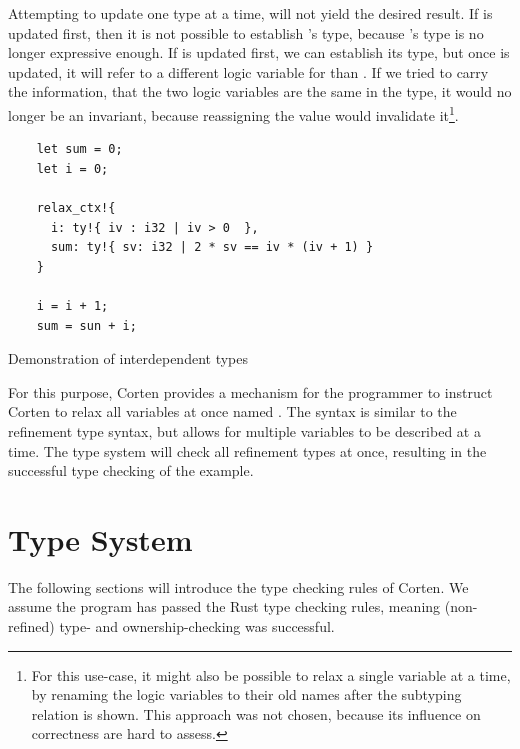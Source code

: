 \documentclass[twoside, english]{sdqthesis}
\theoremstyle{definition}
\begin{document}
Attempting to update one type at a time, will not yield the desired result. If  is updated first, then it is not possible to establish 's type, because 's type is no longer expressive enough.
If  is updated first, we can establish its type, but once  is updated, it will refer to a different logic variable for  than . If we tried to carry the information, that the two logic variables are the same in the type, it would no longer be an invariant, because reassigning the value would invalidate it\footnote{
  For this use-case, it might also be possible to relax a single variable at a time, by renaming the logic variables to their old names after the subtyping relation is shown. This approach was not chosen, because its influence on correctness are hard to assess.
}.

\begin{listing}[ht]
  \begin{verbatim}
    let sum = 0;
    let i = 0;
    
    relax_ctx!{
      i: ty!{ iv : i32 | iv > 0  },
      sum: ty!{ sv: i32 | 2 * sv == iv * (iv + 1) }
    }

    i = i + 1;
    sum = sun + i;

  \end{verbatim}
  \caption{Demonstration of interdependent types}
  \label{lst:mutual-reference}
\end{listing}

For this purpose, Corten provides a mechanism for the programmer to instruct Corten to relax all variables at once \- named . The syntax is similar to the refinement type syntax, but allows for multiple variables to be described at a time. The type system will check all refinement types at once, resulting in the successful type checking of the example.

\fi
\section{Type System}

The following sections will introduce the type checking rules of Corten. We assume the program has passed the Rust type checking rules, meaning (non-refined) type- and ownership-checking was successful.
\end{document}
